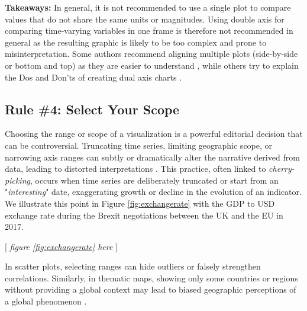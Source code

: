 \documentclass[11pt,twoside,a4paper]{article}
\begin{document}
 \noindent \textbf{ Takeaways:}  In general, it is not recommended to use a single plot to compare values that do not share the same units or magnitudes. Using double axis for comparing time-varying variables in one frame is therefore not recommended in general as the resulting graphic is likely to be too complex and prone to misinterpretation. Some  authors recommend aligning multiple plots (side-by-side or bottom and top) as they are easier to understand \citep{Leo2019economist}, while others try to explain the Dos and Don'ts of creating dual axis charts \citep{Ellis2016Dual-axis}. 


\subsection*{Rule \#4: Select Your Scope}

Choosing the range or scope of a visualization is a powerful editorial decision that can be controversial. Truncating time series, limiting geographic scope, or narrowing axis ranges can subtly or dramatically alter the narrative derived from data, leading to distorted interpretations \citep{Cairo2019}. This practice, often linked to \textit{cherry-picking}, occurs when time series are deliberately truncated or start from an "\textit{interesting}" date, exaggerating growth or decline in the evolution of an indicator. We illustrate this point in Figure \ref{fig:exchangerate} with the  GDP to USD exchange rate during the Brexit negotiations between the UK and the EU in 2017.  

\begin{center}
    [ \textit{figure \ref{fig:exchangerate}  here}  ]
\end{center}

 
In scatter plots, selecting ranges can hide outliers or falsely strengthen correlations. Similarly, in thematic maps, showing only some countries or regions without providing a global context may lead to biased geographic perceptions of a global phenomenon  \citep{bahoken2018English}.
\end{document}
